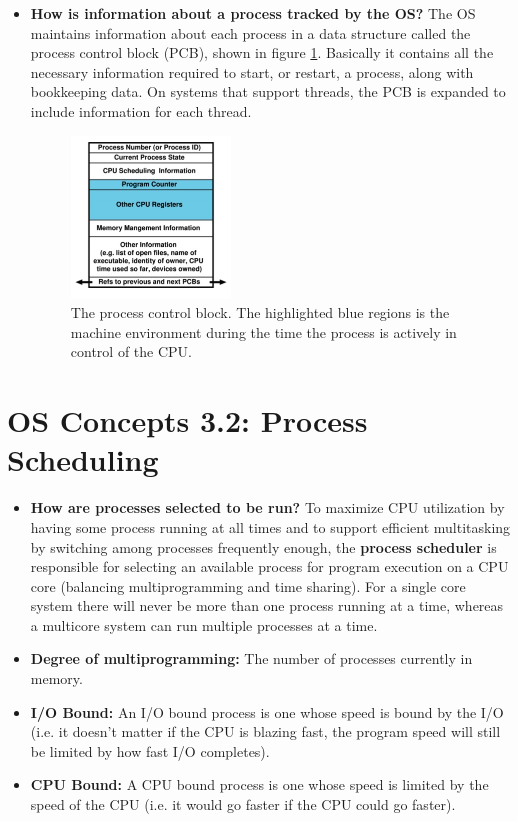 \documentclass[12pt]{article}
\begin{document}
\begin{itemize}
    \item \textbf{How is information about a process tracked by the OS?} The OS maintains information about each process in a data structure called the process control block (PCB), shown in figure \ref{fig:process-control-block}. Basically it contains all the necessary information required to start, or restart, a process, along with bookkeeping data. On systems that support threads, the PCB is expanded to include information for each thread.
    \begin{figure}[ht]
        \centering
        \includegraphics[width=0.4\textwidth]{figures/process-control-block.jpg}
        \caption{The process control block. The highlighted blue regions is the machine environment during the time the process is actively in control of the CPU.}
        \label{fig:process-control-block}
    \end{figure}
\end{itemize}

\section*{OS Concepts 3.2: Process Scheduling}

\begin{itemize}
    \item \textbf{How are processes selected to be run?} To maximize CPU utilization by having some process running at all times and to support efficient multitasking by switching among processes frequently enough, the \textbf{process scheduler} is responsible for selecting an available process for program execution on a CPU core (balancing multiprogramming and time sharing). For a single core system there will never be more than one process running at a time, whereas a multicore system can run multiple processes at a time.
    \item \textbf{Degree of multiprogramming:} The number of processes currently in memory.
    \item \textbf{I/O Bound:} An I/O bound process is one whose speed is bound by the I/O (i.e. it doesn't matter if the CPU is blazing fast, the program speed will still be limited by how fast I/O completes).
    \item \textbf{CPU Bound:} A CPU bound process is one whose speed is limited by the speed of the CPU (i.e. it would go faster if the CPU could go faster).
\end{itemize}
\end{document}
